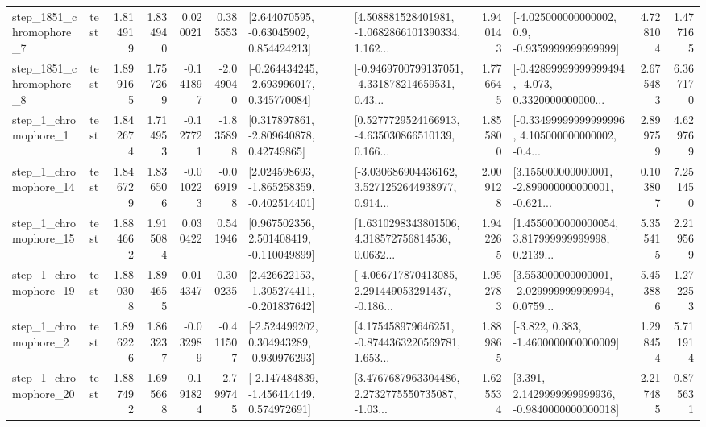 \begin{tabular}{llrrrrllrlrr}
  step\_1851\_chromophore\_7 &      test &      1.814919 &    1.834940 &      0.020021 &  0.385553 &     [2.644070595, -0.63045902, 0.854424213] &  [4.508881528401981, -1.0682866101390334, 1.162... &       1.940143 &     [-4.025000000000002, 0.9, -0.9359999999999999] &            4.728104 &          1.477165 \\
  step\_1851\_chromophore\_8 &      test &      1.899165 &    1.757269 &     -0.141897 & -2.049040 &   [-0.264434245, -2.693996017, 0.345770084] &  [-0.9469700799137051, -4.331878214659531, 0.43... &       1.776645 &  [-0.42899999999999494, -4.073, 0.3320000000000... &            2.675483 &          6.367170 \\
     step\_1\_chromophore\_1 &      test &      1.842674 &    1.714953 &     -0.127721 & -1.835898 &     [0.317897861, -2.809640878, 0.42749865] &  [0.5277729524166913, -4.635030866510139, 0.166... &       1.855800 &  [-0.33499999999999996, 4.105000000000002, -0.4... &            2.899759 &          4.629769 \\
    step\_1\_chromophore\_14 &      test &      1.846729 &    1.836506 &     -0.010223 & -0.069198 &   [2.024598693, -1.865258359, -0.402514401] &  [-3.030686904436162, 3.5271252644938977, 0.914... &       2.009128 &  [3.155000000000001, -2.899000000000001, -0.621... &            0.103807 &          7.251450 \\
    step\_1\_chromophore\_15 &      test &      1.884662 &    1.915084 &      0.030422 &  0.541946 &    [0.967502356, 2.501408419, -0.110049899] &  [1.6310298343801506, 4.318572756814536, 0.0632... &       1.942265 &  [1.4550000000000054, 3.817999999999998, 0.2139... &            5.355415 &          2.219569 \\
    step\_1\_chromophore\_19 &      test &      1.880308 &    1.894655 &      0.014347 &  0.300235 &   [2.426622153, -1.305274411, -0.201837642] &  [-4.066717870413085, 2.291449053291437, -0.186... &       1.952783 &  [3.553000000000001, -2.029999999999994, 0.0759... &            5.453886 &          1.272253 \\
     step\_1\_chromophore\_2 &      test &      1.896226 &    1.863237 &     -0.032989 & -0.411507 &   [-2.524499202, 0.304943289, -0.930976293] &  [4.175458979646251, -0.8744363220569781, 1.653... &       1.889865 &               [-3.822, 0.383, -1.4600000000000009] &            1.298454 &          5.711914 \\
    step\_1\_chromophore\_20 &      test &      1.887492 &    1.695668 &     -0.191824 & -2.799745 &   [-2.147484839, -1.456414149, 0.574972691] &  [3.4767687963304486, 2.2732775550735087, -1.03... &       1.625534 &   [3.391, 2.1429999999999936, -0.9840000000000018] &            2.217485 &          0.875631 \\

\end{tabular}
